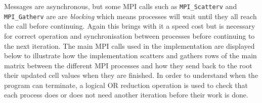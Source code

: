 \documentclass[11pt]{article}
\begin{document}
Messages are asynchronous, but some MPI calls such as \texttt{MPI\_Scatterv} and \texttt{MPI\_Gatherv} are are \textit{blocking} which means processes will wait until they all reach the call before continuing. Again this brings with it a speed cost but is necessary for correct operation and synchronisation between processes before continuing to the next iteration.  The main MPI calls used in the implementation are displayed below to illustrate how the implementation scatters and gathers rows of the main matrix between the different MPI processes and how they send back to the root their updated cell values when they are finished. In order to understand when the program can terminate, a logical OR reduction operation is used to check that each process does or does not need another iteration before their work is done.
\end{document}
